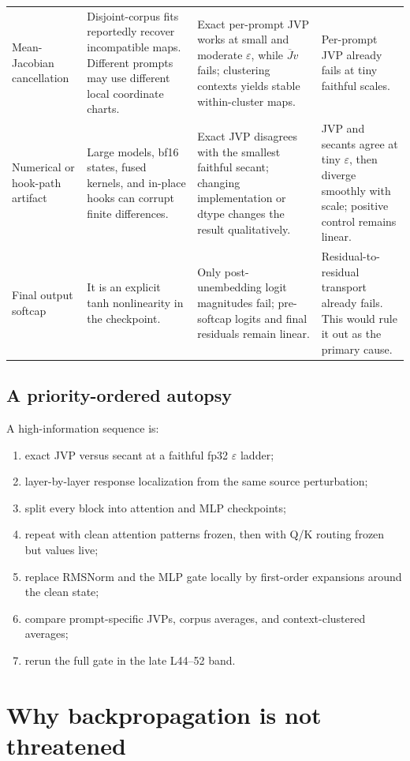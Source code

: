 \documentclass[11pt]{article}
\newcommand{\Jbar}{\overline{J}}
\newcommand{\eps}{\varepsilon}
\theoremstyle{definition}
\theoremstyle{remark}
\begin{document}
\begin{longtable}{@{}p{}p{}p{}p{}@{}}
Mean-Jacobian cancellation
& Disjoint-corpus fits reportedly recover incompatible maps. Different prompts may use different local coordinate charts.
& Exact per-prompt JVP works at small and moderate $\eps$, while $\Jbar v$ fails; clustering contexts yields stable within-cluster maps.
& Per-prompt JVP already fails at tiny faithful scales.\\
\addlinespace

Numerical or hook-path artifact
& Large models, bf16 states, fused kernels, and in-place hooks can corrupt finite differences.
& Exact JVP disagrees with the smallest faithful secant; changing implementation or dtype changes the result qualitatively.
& JVP and secants agree at tiny $\eps$, then diverge smoothly with scale; positive control remains linear.\\
\addlinespace

Final output softcap
& It is an explicit tanh nonlinearity in the checkpoint.
& Only post-unembedding logit magnitudes fail; pre-softcap logits and final residuals remain linear.
& Residual-to-residual transport already fails. This would rule it out as the primary cause.\\
\bottomrule
\end{longtable}
\normalsize

\subsection{A priority-ordered autopsy}
A high-information sequence is:
\begin{enumerate}
  \item exact JVP versus secant at a faithful fp32 $\eps$ ladder;
  \item layer-by-layer response localization from the same source perturbation;
  \item split every block into attention and MLP checkpoints;
  \item repeat with clean attention patterns frozen, then with Q/K routing frozen but values live;
  \item replace RMSNorm and the MLP gate locally by first-order expansions around the clean state;
  \item compare prompt-specific JVPs, corpus averages, and context-clustered averages;
  \item rerun the full gate in the late L44--52 band.
\end{enumerate}

\section{Why backpropagation is not threatened}
\end{document}
